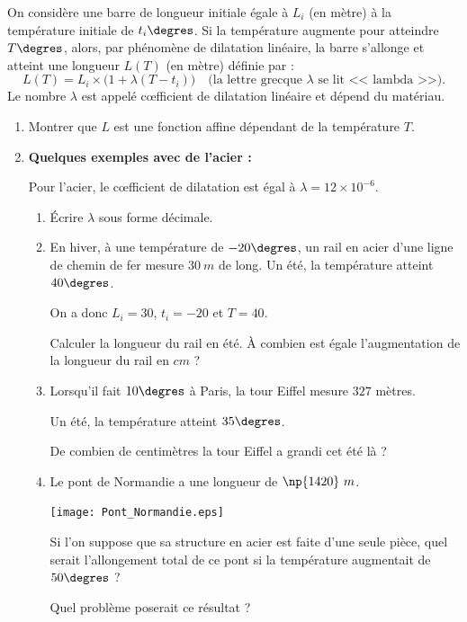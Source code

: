 \documentclass[12pt,french]{book}
\begin{document}
On considère une barre de longueur initiale égale à $L_i$ (en mètre) à la température initiale de $t_i\degres$. Si la température augmente pour atteindre $T\degres$, alors, par phénomène de dilatation linéaire, la barre s'allonge et atteint une longueur $L(T)$ (en mètre) définie par :
\[L(T) = L_i \times \big(1 + \lambda (T - t_i)\big) \quad \text{(la lettre grecque $\lambda$ se lit << lambda >>)}.\]
Le nombre $\lambda$ est appelé c{\oe}fficient de dilatation linéaire et dépend du matériau.\bigskip

\begin{enumerate}
    \item Montrer que $L$ est une fonction affine dépendant de la température $T$.
    \item \textbf{Quelques exemples avec de l'acier :}\par
    Pour l'acier, le c{\oe}fficient de dilatation est égal à $\lambda = 12 \times 10^{-6}$.
    \begin{enumerate}
        \item \'Ecrire $\lambda$ sous forme décimale.
        \item En hiver, à une température de $-20\degres$, un rail en acier d'une ligne de chemin de fer mesure $30~m$ de long. Un été, la température atteint $40\degres$.\par
        On a donc $L_i = 30$, $t_i = -20$ et $T = 40$.\par
        Calculer la longueur du rail en été. À combien est égale l'augmentation de la longueur du rail en $cm$ ?
        \item Lorsqu'il fait $10\degres$ à Paris, la tour Eiffel mesure $327$ mètres.\par Un été, la température atteint $35\degres$.\par
        De combien de centimètres la tour Eiffel a grandi cet été là ?
        \item Le pont de Normandie a une longueur de $\np{1420}~m$.
        \begin{center}
            \texttt{[image: Pont\_Normandie.eps]}
        \end{center}
        Si l'on suppose que sa structure en acier est faite d'une seule pièce, quel serait l'allongement total de ce pont si la température augmentait de $50\degres$ ?\par
        Quel problème poserait ce résultat ?
    \end{enumerate}
\end{enumerate}
\end{document}
